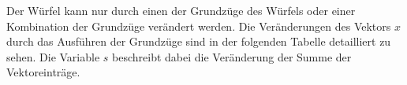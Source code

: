 \documentclass[12pt,a4paper, usenames, dvipsnames]{article}
\theoremstyle{mystyle}
\theoremstyle{definition}
\begin{document}
%
%
%
%
%
%
%
%
%
%


Der Würfel kann nur durch einen der Grundzüge des Würfels oder einer Kombination der Grundzüge verändert werden. Die Veränderungen des Vektors $x$ durch das Ausführen der Grundzüge sind in der folgenden Tabelle detailliert zu sehen. Die Variable $s$ beschreibt dabei die Veränderung der Summe der Vektoreinträge.
\ \\
\end{document}
